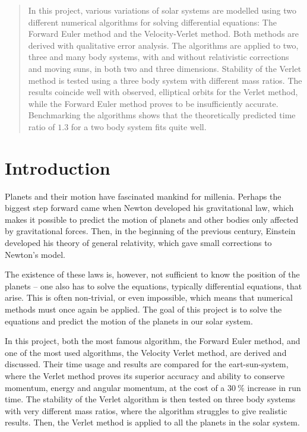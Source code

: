 \documentclass[12pt,english,a4paper]{article}
\begin{document}
%
\pagestyle{fancy}
\tableofcontents

%

\begin{abstract}
In this project, various variations of solar systems are modelled using two different numerical algorithms for solving differential equations: The Forward Euler method and the Velocity-Verlet method. Both methods are derived with qualitative error analysis. The algorithms are applied to two, three and many body systems, with and without relativistic corrections and moving suns, in both two and three dimensions. Stability of the Verlet method is tested using a three body system with different mass ratios. The results coincide well with observed, elliptical orbits for the Verlet method, while the Forward Euler method proves to be insufficiently accurate. Benchmarking the algorithms shows that the theoretically predicted time ratio of \(\num{1.3}\) for a two body system fits quite well.
\end{abstract}



\clearpage
\section{Introduction}
Planets and their motion have fascinated mankind for millenia. Perhaps the biggest step forward came when Newton developed his gravitational law, which makes it possible to predict the motion of planets and other bodies only affected by gravitational forces. Then, in the beginning of the previous century, Einstein developed his theory of general relativity, which gave small corrections to Newton's model.

The existence of these laws is, however, not sufficient to know the position of the planets -- one also has to solve the equations, typically differential equations, that arise. This is often non-trivial, or even impossible, which means that numerical methods must once again be applied. The goal of this project is to solve the equations and predict the motion of the planets in our solar system.

In this project, both the most famous algorithm, the Forward Euler method, and one of the most used algorithms, the Velocity Verlet method, are derived and discussed. Their time usage and results are compared for the eart-sun-system, where the Verlet method proves its superior accuracy and ability to conserve momentum, energy and angular momentum, at the cost of a \(\SI{30}{\percent}\) increase in run time. The stability of the Verlet algorithm is then tested on three body systems with very different mass ratios, where the algorithm struggles to give realistic results. Then, the Verlet method is applied to all the planets in the solar system.
\end{document}

